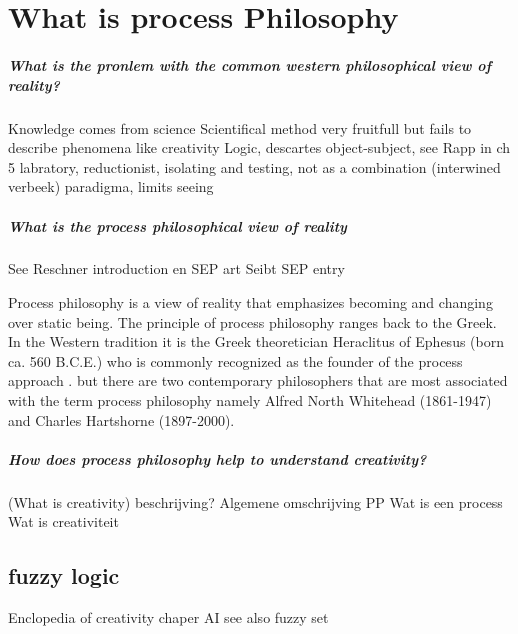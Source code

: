 \documentclass[a4paper]{Thesis}
\begin{document}
\chapter{What is process Philosophy}

\paragraph{What is the pronlem with the common western philosophical view of reality?}
	Knowledge comes from science
	Scientifical method very fruitfull but fails to describe phenomena like creativity
		Logic, descartes object-subject, see Rapp in ch 5
		labratory, reductionist, isolating and testing, not as a combination (interwined verbeek)
		paradigma, limits seeing
		
\paragraph{What is the process philosophical view of reality}
See Reschner introduction en SEP art \cite{Rescher-2012-sep}
Seibt SEP entry \cite{Seibt-2013-sep}


Process philosophy is a view of reality that emphasizes becoming and changing over static being. The principle of process philosophy ranges back to the Greek.
In the Western tradition it is the Greek theoretician Heraclitus of Ephesus (born ca. 560 B.C.E.) who is commonly recognized as the founder of the process approach \cite{Seibt-2013-sep}. 
 but there are two contemporary philosophers that are most associated with the term process philosophy namely Alfred North Whitehead (1861-1947) and Charles Hartshorne (1897-2000).



\paragraph{How does process philosophy help to understand creativity?}

\paragragph(What is creativity)
 beschrijving?
Algemene omschrijving PP
Wat is een process
Wat is creativiteit




\section{fuzzy logic}
Enclopedia of creativity chaper AI
see also fuzzy set
\end{document}
